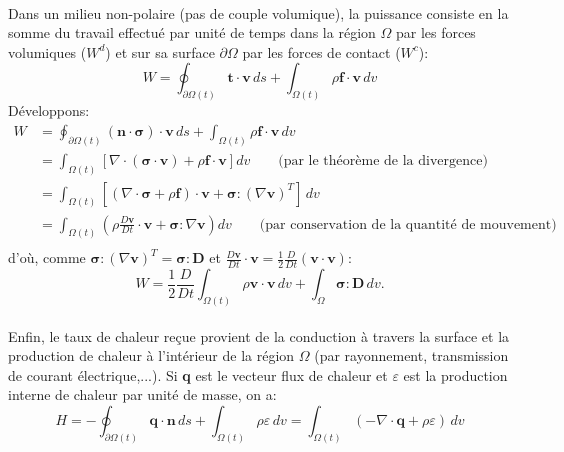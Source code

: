 \paragraph{}
Dans un milieu non-polaire (pas de couple volumique), la puissance consiste en la somme du travail effectué par unité de temps dans la région $\Omega$ par les forces volumiques ($W^d$) et sur sa surface $\partial \Omega$ par les forces de contact ($W^c$):
\begin{equation}\label{eq:travail}W=\oint_{\partial \Omega (t)}\textbf{t}\cdot\textbf{v}\,ds+\int_{\Omega (t)}\rho\textbf{f}\cdot\textbf{v}\,dv\end{equation}
Développons:
$$\begin{aligned}
W&=\oint_{\partial \Omega (t)}(\textbf{\^n}\cdot\boldsymbol{\sigma})\cdot\textbf{v}\,ds+\int_{\Omega (t)}\rho\textbf{f}\cdot\textbf{v}\,dv\\
 &=\int_{\Omega (t)}[\nabla\cdot(\boldsymbol{\sigma}\cdot\textbf{v})+\rho\textbf{f}\cdot\textbf{v}]dv\qquad\text{(par le théorème de la divergence)}\\
 &=\int_{\Omega (t)}[(\nabla\cdot\boldsymbol{\sigma}+\rho\textbf{f})\cdot\textbf{v}+\boldsymbol{\sigma}:(\nabla\textbf{v})^T]\,dv\\
 &=\int_{\Omega (t)}\left(\rho\frac{D\textbf{v}}{Dt}\cdot\textbf{v}+\boldsymbol{\sigma}:\nabla\textbf{v}\right)dv\qquad\text{(par conservation de la quantité de mouvement)}\\ 
\end{aligned}$$
d'où, comme $\boldsymbol{\sigma}:(\nabla\textbf{v})^T=\boldsymbol{\sigma}:\textbf{D}$ et $\frac{D\textbf{v}}{Dt}\cdot\textbf{v}=\frac{1}{2}\frac{D}{Dt}(\textbf{v}\cdot\textbf{v})$:
\begin{equation}\label{eq:travail2}W=\frac{1}{2}\frac{D}{Dt}\int_{\Omega (t)}\rho\textbf{v}\cdot\textbf{v}\,dv+\int_{\Omega}\boldsymbol{\sigma}:\textbf{D}\,dv.\end{equation}
\paragraph{}
Enfin, le taux de chaleur reçue provient de la conduction à travers la surface et la production de chaleur à l'intérieur de la région $\Omega$ (par rayonnement, transmission de courant électrique,...). Si \textbf{q} est le vecteur flux de chaleur et $\varepsilon$ est la production interne de chaleur par unité de masse, on a:
$$H=-\oint_{\partial \Omega (t)}\textbf{q}\cdot\textbf{\^n}\,ds+\int_{\Omega(t)}\rho\varepsilon\,dv=\int_{\Omega (t)}(-\nabla\cdot\textbf{q}+\rho\varepsilon)\,dv$$
